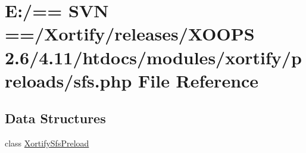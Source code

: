 \hypertarget{sfs_8php}{\section{E\-:/== S\-V\-N ==/\-Xortify/releases/\-X\-O\-O\-P\-S 2.6/4.11/htdocs/modules/xortify/preloads/sfs.php File Reference}
\label{sfs_8php}
}
\subsection*{Data Structures}
\begin{DoxyCompactItemize}
\item 
class \hyperlink{class_xortify_sfs_preload}{Xortify\-Sfs\-Preload}
\end{DoxyCompactItemize}
